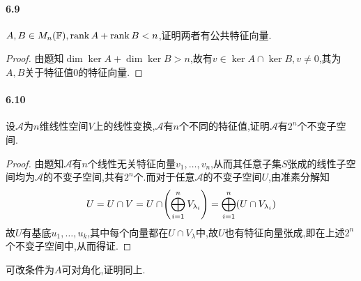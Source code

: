 \documentclass[11pt]{article}
\begin{document}
\paragraph{6.9}$A,B\in M_n(\mathbb{F}), \operatorname{rank} A+\operatorname{rank} B<n$,证明两者有公共特征向量.
\begin{proof}
    由题知$\dim \ker A + \dim \ker B > n$,故有$v\in \ker A \cap \ker B, v\neq 0$,其为$A,B$关于特征值0的特征向量.
\end{proof}
\paragraph{6.10}设$\mathscr{A}$为$n$维线性空间$V$上的线性变换,$\mathscr{A}$有$n$个不同的特征值,证明$\mathscr{A}$有$2^n$个不变子空间.
\begin{proof}
    由题知$\mathscr{A}$有$n$个线性无关特征向量$v_1,\dots,v_n$,从而其任意子集$S$张成的线性子空间均为$\mathscr{A}$的不变子空间,共有$2^n$个.而对于任意$\mathscr{A}$的不变子空间$U$,由准素分解知
    $$U=U\cap V=U\cap \!\left(\bigoplus_{i=1}^n V_{\lambda_i}\right)=\bigoplus_{i=1}^n (U\cap V_{\lambda_i})$$
    故$U$有基底$u_1,\dots,u_k$,其中每个向量都在$U\cap V_\lambda$中,故$U$也有特征向量张成,即在上述$2^n$个不变子空间中,从而得证.
\end{proof}
\begin{remark}
    可改条件为$A$可对角化,证明同上.
\end{remark}
\end{document}
